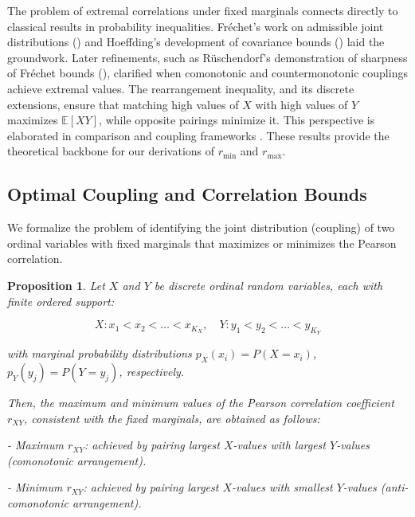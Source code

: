 \documentclass[
  12pt,
]{article}
\theoremstyle{plain}
\newtheorem{proposition}[theorem]{Proposition}
\theoremstyle{definition}
\theoremstyle{remark}
\begin{document}
The problem of extremal correlations under fixed marginals connects
directly to classical results in probability inequalities. Fréchet's
work on admissible joint distributions (\autocite{frec51-tableaux}) and
Hoeffding's development of covariance bounds
(\autocite{hoef40-masstabinvariante}) laid the groundwork. Later
refinements, such as Rüschendorf's demonstration of sharpness of Fréchet
bounds (\autocite{rusc81-sharpness}), clarified when comonotonic and
countermonotonic couplings achieve extremal values. The rearrangement
inequality, and its discrete extensions, ensure that matching high
values of \(X\) with high values of \(Y\) maximizes \(\mathbb{E}[XY]\),
while opposite pairings minimize it. This perspective is elaborated in
comparison and coupling frameworks
\autocite{mull02-comparison,thor00-coupling}. These results provide the
theoretical backbone for our derivations of \(r_{\min}\) and
\(r_{\max}\).

\subsection{Optimal Coupling and Correlation
Bounds}\label{optimal-coupling-and-correlation-bounds}

We formalize the problem of identifying the joint distribution
(coupling) of two ordinal variables with fixed marginals that maximizes
or minimizes the Pearson correlation.

\label{prop-max-product}
\begin{proposition}

Let $X$ and $Y$ be discrete ordinal random variables, each with finite ordered support:

$$
X: x_1 < x_2 < \dots < x_{K_X},\quad Y: y_1 < y_2 < \dots < y_{K_Y}
$$

with marginal probability distributions $p_X(x_i) = P(X = x_i)$, $p_Y(y_j) = P(Y = y_j)$, respectively.

Then, the maximum and minimum values of the Pearson correlation coefficient $r_{XY}$, consistent with the fixed marginals, are obtained as follows:

- Maximum $r_{XY}$: achieved by pairing largest $X$-values with largest $Y$-values (comonotonic arrangement).
    
- Minimum $r_{XY}$: achieved by pairing largest $X$-values with smallest $Y$-values (anti-comonotonic arrangement).
\end{proposition}
\end{document}
